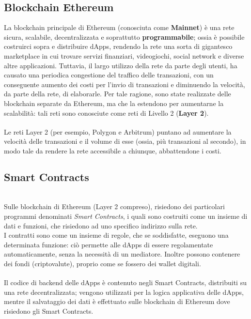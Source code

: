 \documentclass[12pt,a4paper]{report}
\begin{document}
\subsection{Blockchain Ethereum}
La blockchain principale di Ethereum (conosciuta come \textbf{Mainnet}) è una rete sicura, scalabile, decentralizzata e soprattutto \textbf{programmabile}; ossia è possibile costruirci sopra e distribuire dApps, rendendo la rete una sorta di gigantesco marketplace in cui trovare servizi finanziari, videogiochi, social network e diverse altre applicazioni. 
Tuttavia, il largo utilizzo della rete da parte degli utenti, ha causato una periodica congestione del traffico delle transazioni, con un conseguente aumento dei costi per l'invio di transazioni e diminuendo la velocità, da parte della rete, di elaborarle.
Per tale ragione, sono state realizzate delle blockchain separate da Ethereum, ma che la estendono per aumentarne la scalabilità: tali reti sono conosciute come reti di Livello 2 (\textbf{Layer 2}).
\\\\Le reti Layer 2 (per esempio, Polygon\cite{polygon} e Arbitrum\cite{arbitrum}) puntano ad aumentare la velocità delle transazioni e il volume di esse (ossia, più transazioni al secondo), in modo tale da rendere la rete accessibile a chiunque, abbattendone i costi.

\subsection{Smart Contracts}
\\Sulle blockchain di Ethereum (Layer 2 compreso), risiedono dei particolari programmi denominati \textit{Smart Contracts}\cite{smartcontracts}, i quali sono costruiti come un insieme di dati e funzioni, che risiedono ad uno specifico indirizzo sulla rete.
\\I contratti sono come un insieme di regole, che se soddisfatte, eseguono una determinata funzione: ciò permette alle dApps di essere regolamentate automaticamente, senza la necessità di un mediatore. Inoltre possono contenere dei fondi (criptovalute), proprio come se fossero dei wallet digitali.
\\\\Il codice di backend delle dApps è contenuto negli Smart Contracts, distribuiti su una rete decentralizzata; vengono utilizzati per la logica applicativa delle dApps, mentre il salvataggio dei dati è effettuato sulle blockchain di Ethereum dove risiedono gli Smart Contracts.
\end{document}

